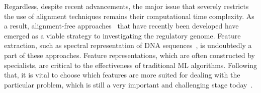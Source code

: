 Regardless, despite recent advancements, the major issue that severely restricts the use of alignment techniques remains their computational time complexity. As a result, alignment-free approaches~\cite{Vinga2003Alignment-freeReview,Pinello2014ApplicationsEpigenomics} that have recently been developed have emerged as a viable strategy to investigating the regulatory genome. Feature extraction, such as spectral representation of DNA sequences~\cite{LoBosco2014ASequences,LoBosco2015AlignmentClassification}, is undoubtedly a part of these approaches. Feature representations, which are often constructed by specialists, are critical to the effectiveness of traditional \gls{ML} algorithms. Following that, it is vital to choose which features are more suited for dealing with the particular problem, which is still a very important and challenging stage today~\cite{LoBosco2017DeepClassification}.